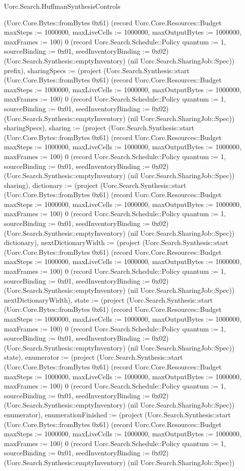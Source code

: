 \begin{lexlean}{Uorc.Search.HuffmanSynthesisControls}
\begin{semanticmodule}
{(Uorc.Core.Bytes::fromBytes 0x61) (record Uorc.Core.Resources::Budget {maxSteps := 1000000, maxLiveCells := 1000000, maxOutputBytes := 1000000, maxFrames := 100}) 0 (record Uorc.Search.Schedule::Policy {quantum := 1, sourceBinding := 0x01, seedInventoryBinding := 0x02}) (Uorc.Search.Synthesis::emptyInventory) (nil Uorc.Search.SharingJob::Spec)) prefix), sharingSpecs := (project (Uorc.Search.Synthesis::start (Uorc.Core.Bytes::fromBytes 0x61) (record Uorc.Core.Resources::Budget {maxSteps := 1000000, maxLiveCells := 1000000, maxOutputBytes := 1000000, maxFrames := 100}) 0 (record Uorc.Search.Schedule::Policy {quantum := 1, sourceBinding := 0x01, seedInventoryBinding := 0x02}) (Uorc.Search.Synthesis::emptyInventory) (nil Uorc.Search.SharingJob::Spec)) sharingSpecs), sharing := (project (Uorc.Search.Synthesis::start (Uorc.Core.Bytes::fromBytes 0x61) (record Uorc.Core.Resources::Budget {maxSteps := 1000000, maxLiveCells := 1000000, maxOutputBytes := 1000000, maxFrames := 100}) 0 (record Uorc.Search.Schedule::Policy {quantum := 1, sourceBinding := 0x01, seedInventoryBinding := 0x02}) (Uorc.Search.Synthesis::emptyInventory) (nil Uorc.Search.SharingJob::Spec)) sharing), dictionary := (project (Uorc.Search.Synthesis::start (Uorc.Core.Bytes::fromBytes 0x61) (record Uorc.Core.Resources::Budget {maxSteps := 1000000, maxLiveCells := 1000000, maxOutputBytes := 1000000, maxFrames := 100}) 0 (record Uorc.Search.Schedule::Policy {quantum := 1, sourceBinding := 0x01, seedInventoryBinding := 0x02}) (Uorc.Search.Synthesis::emptyInventory) (nil Uorc.Search.SharingJob::Spec)) dictionary), nextDictionaryWidth := (project (Uorc.Search.Synthesis::start (Uorc.Core.Bytes::fromBytes 0x61) (record Uorc.Core.Resources::Budget {maxSteps := 1000000, maxLiveCells := 1000000, maxOutputBytes := 1000000, maxFrames := 100}) 0 (record Uorc.Search.Schedule::Policy {quantum := 1, sourceBinding := 0x01, seedInventoryBinding := 0x02}) (Uorc.Search.Synthesis::emptyInventory) (nil Uorc.Search.SharingJob::Spec)) nextDictionaryWidth), state := (project (Uorc.Search.Synthesis::start (Uorc.Core.Bytes::fromBytes 0x61) (record Uorc.Core.Resources::Budget {maxSteps := 1000000, maxLiveCells := 1000000, maxOutputBytes := 1000000, maxFrames := 100}) 0 (record Uorc.Search.Schedule::Policy {quantum := 1, sourceBinding := 0x01, seedInventoryBinding := 0x02}) (Uorc.Search.Synthesis::emptyInventory) (nil Uorc.Search.SharingJob::Spec)) state), enumerator := (project (Uorc.Search.Synthesis::start (Uorc.Core.Bytes::fromBytes 0x61) (record Uorc.Core.Resources::Budget {maxSteps := 1000000, maxLiveCells := 1000000, maxOutputBytes := 1000000, maxFrames := 100}) 0 (record Uorc.Search.Schedule::Policy {quantum := 1, sourceBinding := 0x01, seedInventoryBinding := 0x02}) (Uorc.Search.Synthesis::emptyInventory) (nil Uorc.Search.SharingJob::Spec)) enumerator), enumerationFinished := (project (Uorc.Search.Synthesis::start (Uorc.Core.Bytes::fromBytes 0x61) (record Uorc.Core.Resources::Budget {maxSteps := 1000000, maxLiveCells := 1000000, maxOutputBytes := 1000000, maxFrames := 100}) 0 (record Uorc.Search.Schedule::Policy {quantum := 1, sourceBinding := 0x01, seedInventoryBinding := 0x02}) (Uorc.Search.Synthesis::emptyInventory) (nil Uorc.Search.SharingJob::Spec)) }
\end{semanticmodule}
\end{lexlean}
